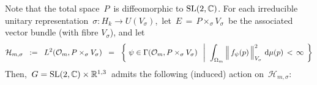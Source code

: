 \begin{itemize}
	Note that the total space \,$P$\, is diffeomorphic to $\textnormal{SL}(2,\mathbb{C})$.
	For each irreducible unitary representation
	\,$\sigma : H_{k} \longrightarrow U(V_{\sigma})$,\,
	let
	\,$E \,=\, P\times_{\sigma}V_{\sigma}$\,
	be the associated vector bundle (with fibre $V_{\sigma}$), and
	let
	\begin{equation*}
	\mathcal{H}_{m,\sigma}
	\;\; := \;\;
		L^{2}(\mathcal{O}_{m},P\times_{\sigma}V_{\sigma})
	\;\; = \;\;
		\left\{\;
			\psi \in \Gamma(\mathcal{O}_{m},P\times_{\sigma}V_{\sigma})
			\;\;\left\vert\;\;
			\int_{\Omega_{m}}
				\left\Vert\,\overset{{\color{white}.}}{f_{\psi}(p)}\,\right\Vert_{V_{\sigma}}^{2}
				\,\d\mu(p)
			\, < \, \infty
			\right.
			\;\right\}
	\end{equation*}
	Then,
	\,$G = \textnormal{SL}(2,\mathbb{C}) \times \mathbb{R}^{1,3}$\,
	admits the following (induced) action on \,$\mathcal{H}_{m,\sigma}$:\,
\end{itemize}


